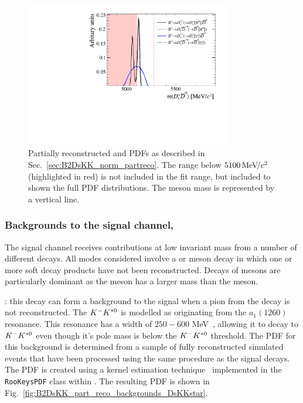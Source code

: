 \begin{figure}[!h]
    \centering
    \includegraphics[width=0.80\textwidth]{figs/B2DsKK/B2DsKK_DsD0_part_reco_Shapes.pdf}
    \caption{Partially reconstructed \decay{\Bp}{\Dssp\Dzb} and \decay{\Bp}{\Dsp\Dstarzb} PDFs as described in Sec.~\ref{sec:B2DsKK_norm_partreco}. The range below $5100{\mathrm{\,Me\kern -0.1em V\!/}c^2}$ (highlighted in red) is not included in the fit range, but included to shown the full PDF distributions. The \Bp meson mass is represented by a vertical line.} 
    \label{fig:B2DsKK_DsD0_partreco}   
\end{figure}





\subsubsection{Backgrounds to the signal channel, \decay{\Bp}{\Dsp\Kp\Km}}

The signal channel receives contributions at low invariant mass from a number of different decays. 
All modes considered involve a \Bs or \Bz meson decay in which one or more soft decay products have not been reconstructed.
Decays of \Bs mesons are particularly dominant as the \Bs meson has a larger mass than the \Bp meson.   

\begin{description}
\item \decay{\Bsb}{\Dsp\Km\Kstarz}: this decay can form a background to the \decay{\Bp}{\Dsp\Kp\Km} signal when a pion from the \decay{\Kstarz}{\Kp\pim} decay is not reconstructed. The ${{K}^-}{{K}^{*0}}$ is modelled as originating from the $a_1(1260)$ resonance. This resonance has a width of $250-600$ MeV~\cite{PDG2016}, allowing it to decay to ${{K}^-}{{K}^{*0}}$ even though it's pole mass is below the ${{K}^-}{{K}^{*0}}$ threshold.
The PDF for this background is determined from a sample of fully reconstructed simulated events that have been processed using the same procedure as the signal decays. The PDF is created using a kernel estimation technique~\cite{Cranmer:2000du} implemented in the \texttt{RooKeysPDF} class within \roofit. The resulting PDF is shown in Fig.~\ref{fig:B2DsKK_part_reco_backgrounds_DsKKstar}.
\end{description}

